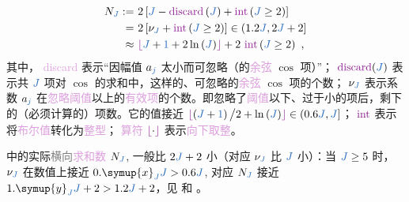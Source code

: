 \begin{subequations} \label{eq:chord-N=2J+2_effective}
	\begin{align}
		N_{\textcolor{NavyBlue}{J}} :=&~ 2 \left[ {\textcolor{NavyBlue}{J}} -  \text{\textcolor{Plum}{discard}} \left({\textcolor{NavyBlue}{J}} \right) + \text{\textcolor{Plum}{int}} \left( {\textcolor{NavyBlue}{J}} \geq 2 \right) \right] \label{eq:chord-N=2J+2_effective-a} \\ 
		=&~ 2 \left[ {\nu}_{\textcolor{NavyBlue}{J}} + \text{\textcolor{Plum}{int}} \left({\textcolor{NavyBlue}{J}} \geq 2 \right) \right] \in \left( 1.2 {\textcolor{NavyBlue}{J}}, 2 {\textcolor{NavyBlue}{J}} + 2 \right] \label{eq:chord-N=2J+2_effective-b} \\ 
		\approx&~ \textcolor{Plum}{\lfloor \textcolor{black}{ \textcolor{NavyBlue}{J} + \textcolor{NavyBlue}{1} + 2 \ln \left( \textcolor{NavyBlue}{J} \right) } \rfloor} + 2~ \text{\textcolor{Plum}{int}} \left( {\textcolor{NavyBlue}{J}} \geq 2 \right) ~,
		\label{eq:chord-N=2J+2_effective-c}
	\end{align}
\end{subequations}
其中，{\one} \textcolor{Plum}{discard} 表示“因幅值 $a_{\textcolor{NavyBlue}{j}}$ 太小而可忽略（的\textcolor{Plum}{余弦} $\cos$ 项）”；{\two} $\text{\textcolor{Plum}{discard}}({\textcolor{NavyBlue}{J}})$ 表示共 ${\textcolor{NavyBlue}{J}}$ 项对 $\cos$ 的求和中，这样的、可忽略的\textcolor{Plum}{余弦} $\cos$ 项的个数；{\three} ${\nu}_{\textcolor{NavyBlue}{J}}$ 表示系数 $a_{\textcolor{NavyBlue}{j}}$ 在\textcolor{Plum}{忽略阈值}以上的\textcolor{Plum}{有效项}的个数。即忽略了\textcolor{Plum}{阈值}以下、过于小的项后，剩下的（必须计算的）项数。它的值接近 $\textcolor{Plum}{\lfloor \textcolor{black}{ \left( \textcolor{NavyBlue}{J} + \textcolor{NavyBlue}{1} \right) \big/ 2 + \ln \left( \textcolor{NavyBlue}{J} \right) } \rfloor} \in \left( 0.6 {\textcolor{NavyBlue}{J}}, {\textcolor{NavyBlue}{J}} \right]$；{\four} $\text{\textcolor{Plum}{int}}$ 表示将\textcolor{Plum}{布尔值}转化为\textcolor{Plum}{整型}；{\five} \textcolor{Plum}{算符} $\textcolor{Plum}{\lfloor \textcolor{black}{\cdot} \rfloor}$ 表示\textcolor{Plum}{向下取整}。

 中的实际\textcolor{gray}{横向}\textcolor{Plum}{求和数} $N_{\textcolor{NavyBlue}{J}}$, 一般比 $2\textcolor{NavyBlue}{J} + 2$ 小（对应 $\nu_{\textcolor{NavyBlue}{J}}$ 比 $\textcolor{NavyBlue}{J}$ 小）：当 $\textcolor{NavyBlue}{J} \geq 5$ 时，$\nu_{\textcolor{NavyBlue}{J}}$ 在数值上接近 $0.\symup{x}_{\textcolor{NavyBlue}{J}} \textcolor{NavyBlue}{J} > 0.6 \textcolor{NavyBlue}{J}$, 对应 $N_{\textcolor{NavyBlue}{J}}$ 接近 $1.\symup{y}_{\textcolor{NavyBlue}{J}} \textcolor{NavyBlue}{J} + 2 > 1.2\textcolor{NavyBlue}{J} + 2$，见  和 。


